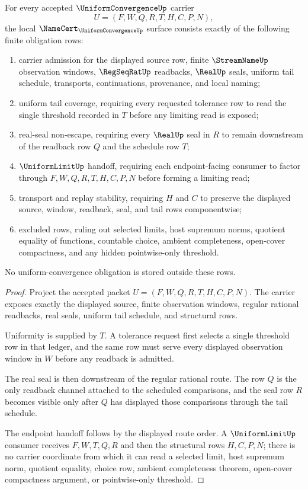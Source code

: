 \begin{theorem}
\label{thm:uniform-convergence-namecert-obligations}
For every accepted $\UniformConvergenceUp$ carrier
$$
U=(F,W,Q,R,T,H,C,P,N),
$$
the local $\NameCert_{\UniformConvergenceUp}$ surface consists exactly of the following finite obligation rows:
\begin{enumerate}
\item carrier admission for the displayed source row, finite $\StreamNameUp$ observation windows, $\RegSeqRatUp$ readbacks, $\RealUp$ seals, uniform tail schedule, transports, continuations, provenance, and local naming;
\item uniform tail coverage, requiring every requested tolerance row to read the single threshold recorded in $T$ before any limiting read is exposed;
\item real-seal non-escape, requiring every $\RealUp$ seal in $R$ to remain downstream of the readback row $Q$ and the schedule row $T$;
\item $\UniformLimitUp$ handoff, requiring each endpoint-facing consumer to factor through $F,W,Q,R,T,H,C,P,N$ before forming a limiting read;
\item transport and replay stability, requiring $H$ and $C$ to preserve the displayed source, window, readback, seal, and tail rows componentwise;
\item excluded rows, ruling out selected limits, host supremum norms, quotient equality of functions, countable choice, ambient completeness, open-cover compactness, and any hidden pointwise-only threshold.
\end{enumerate}
No uniform-convergence obligation is stored outside these rows.
\end{theorem}

\begin{proof}
Project the accepted packet $U=(F,W,Q,R,T,H,C,P,N)$. The carrier exposes exactly the displayed source, finite observation windows, regular rational readbacks, real seals, uniform tail schedule, and structural rows.

Uniformity is supplied by $T$. A tolerance request first selects a single threshold row in that ledger, and the same row must serve every displayed observation window in $W$ before any readback is admitted.

The real seal is then downstream of the regular rational route. The row $Q$ is the only readback channel attached to the scheduled comparisons, and the seal row $R$ becomes visible only after $Q$ has displayed those comparisons through the tail schedule.

The endpoint handoff follows by the displayed route order. A $\UniformLimitUp$ consumer receives $F,W,T,Q,R$ and then the structural rows $H,C,P,N$; there is no carrier coordinate from which it can read a selected limit, host supremum norm, quotient equality, choice row, ambient completeness theorem, open-cover compactness argument, or pointwise-only threshold.
\end{proof}

